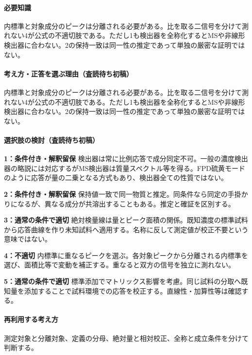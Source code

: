 \paragraph{必要知識} 内標準と対象成分のピークは分離される必要がある。比を取る二信号を分けて測れない4が公式の不適切肢である。ただし1も検出器を全称化するとMSや非線形検出器に合わない。2の保持一致は同一性の推定であって単独の厳密な証明ではない。

\paragraph{考え方・正答を選ぶ理由（査読待ち初稿）} 内標準と対象成分のピークは分離される必要がある。比を取る二信号を分けて測れない4が公式の不適切肢である。ただし1も検出器を全称化するとMSや非線形検出器に合わない。2の保持一致は同一性の推定であって単独の厳密な証明ではない。

\paragraph{選択肢の検討（査読待ち初稿）}\mbox{}\par

\noindent\textbf{1：条件付き・解釈留保} 検出器は常に比例応答で成分同定不可。一般の濃度検出器の略説には対応するがMS検出器は質量スペクトル等を得る。FPD硫黄モードのように応答が量の二乗となる方式もあり、検出器全ての性質ではない。\par

\noindent\textbf{2：条件付き・解釈留保} 保持値一致で同一物質と推定。同条件なら同定の手掛かりになるが、異なる成分が共溶出することもある。推定と確証を区別する。\par

\noindent\textbf{3：通常の条件で適切} 絶対検量線は量とピーク面積の関係。既知濃度の標準試料から応答曲線を作り未知試料へ適用する。名称に反して測定値が校正不要という意味ではない。\par

\noindent\textbf{4：不適切} 内標準に重なるピークを選ぶ。各対象ピークから分離される内標準を選び、面積比等で変動を補正する。重なると双方の信号を独立に測れない。\par

\noindent\textbf{5：通常の条件で適切} 標準添加でマトリックス影響を考慮。同じ試料の分取へ既知量を添加することで試料環境での応答を校正する。直線性・加算性等は確認する。\par

\paragraph{再利用する考え方} 測定対象と分離対象、定義の分母、絶対量と相対校正、全称と成立条件を分けて判断する。

